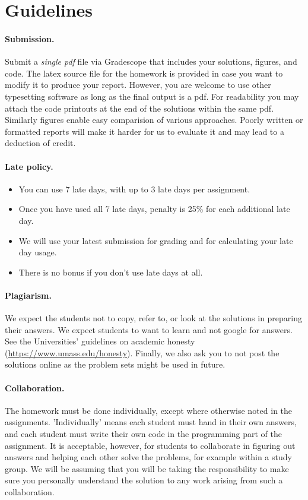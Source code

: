 \section*{Guidelines}
\paragraph{Submission.} Submit a \emph{single pdf} file via
Gradescope that includes your solutions, figures, and code. The latex
source file for the homework is provided in case you want to modify it
to produce your report. However, you are welcome to use other
typesetting software as long as the final output is a pdf.
For readability you may attach the code printouts at the end of the
solutions within the same pdf.
Similarly figures enable easy comparision of various approaches.
Poorly written or formatted reports will make it harder for us to
evaluate it and may lead to a deduction of credit.


\paragraph{Late policy.}
\begin{itemize}
\item You can use 7 late days, with up to 3 late days per assignment.
\item Once you have used all 7 late days, penalty is 25\% for each additional late day.
\item We will use your latest submission for grading and for calculating your late day usage.
\item There is no bonus if you don't use late days at all.
\end{itemize}


\paragraph{Plagiarism.}
We expect the students not to copy, refer to, or look at the solutions
in preparing their answers. We expect students to want to learn and
not google for answers. See the Universities' guidelines on academic
honesty (\url{https://www.umass.edu/honesty}).
Finally, we also ask you to not post the solutions online as the
problem sets might be used in future.


\paragraph{Collaboration.} The homework must be done individually,
except where otherwise noted in the assignments. 'Individually' means
each student must hand in their own answers, and each student must
write their own code in the programming part of the assignment. It is
acceptable, however, for students to collaborate in figuring out
answers and helping each other solve the problems, for example within
a study group.
We will be assuming that you will be taking the responsibility to make
sure you personally understand the solution to any work arising from
such a collaboration.


